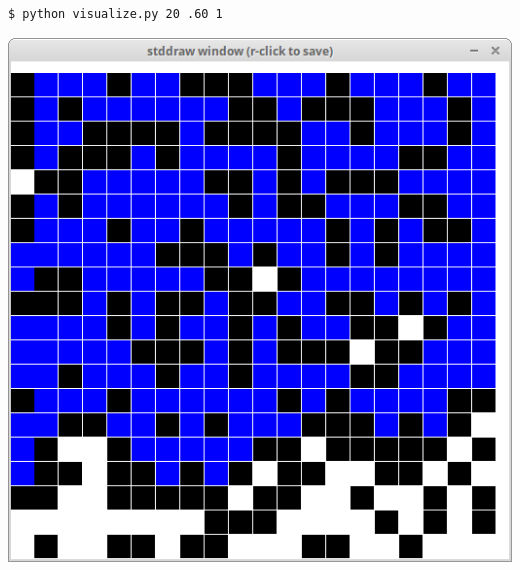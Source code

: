 \documentclass[8pt,a4paper,compress,handout]{beamer}
\begin{document}
\begin{frame}[fragile]
\begin{minipage}{160pt}
\begin{lstlisting}[language={}]
$ python visualize.py 20 .60 1
\end{lstlisting}
\end{minipage}%
\begin{minipage}{140pt}
\hfill \includegraphics[scale=0.15]{figures/percolation8.png}
\end{minipage}

\smallskip


\end{frame}
\end{document}
